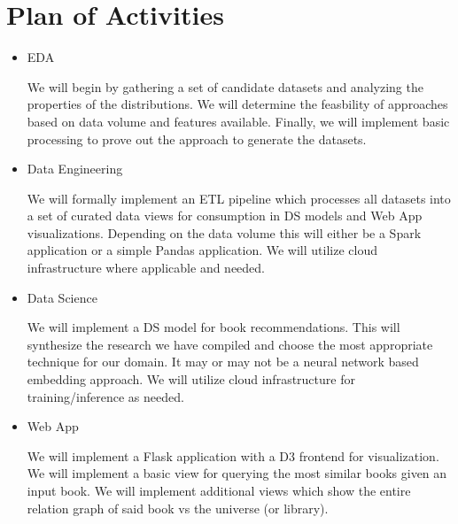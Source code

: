 
\section{Plan of Activities}

\begin{itemize}
    \item EDA

    We will begin by gathering a set of candidate datasets and analyzing the properties of the distributions. We will determine the feasbility of approaches based on data volume and features available. Finally, we will implement basic processing to prove out the approach to generate the datasets.
    
    \item Data Engineering

    We will formally implement an ETL pipeline which processes all datasets into a set of curated data views for consumption in DS models and Web App visualizations. Depending on the data volume this will either be a Spark application or a simple Pandas application. We will utilize cloud infrastructure where applicable and needed.
    
    \item Data Science

    We will implement a DS model for book recommendations. This will synthesize the research we have compiled and choose the most appropriate technique for our domain. It may or may not be a neural network based embedding approach. We will utilize cloud infrastructure for training/inference as needed.
    
    \item Web App

    We will implement a Flask application with a D3 frontend for visualization. We will implement a basic view for querying the most similar books given an input book. We will implement additional views which show the entire relation graph of said book vs the universe (or library).
    
\end{itemize}

